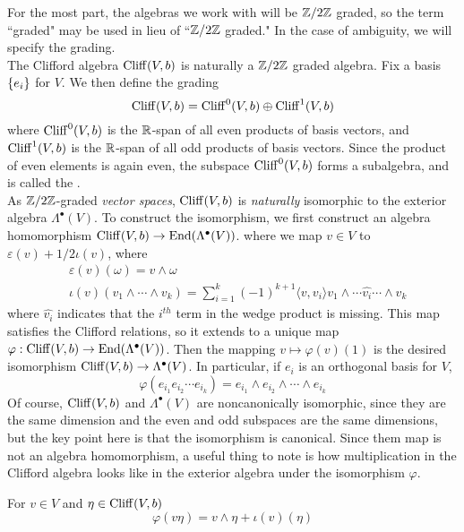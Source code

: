 %
For the most part, the algebras we work with will be $\mathbb{Z}/2\mathbb{Z}$ graded, so
the term ``graded" may be used in lieu of ``$\mathbb{Z}/2\mathbb{Z}$ graded." In the case of
ambiguity, we will specify the grading. \\
The Clifford algebra $\operatorname{Cliff}(V,b)$ is naturally a $\mathbb{Z}/2\mathbb{Z}$ graded algebra. Fix
a basis $\left\lbrace e_i \right\rbrace$ for $V$. We then define the grading
\[
\operatorname{Cliff}(V,b) = \operatorname{Cliff}^0(V,b) \oplus \operatorname{Cliff}^1(V,b)
\]
where $\operatorname{Cliff}^0(V,b)$ is the $\mathbb{R}$-span of all even products of basis vectors,
and $\operatorname{Cliff}^1(V,b)$ is the $\mathbb{R}$-span of all odd products of basis vectors.
Since the product of even elements is again even, the subspace
$\operatorname{Cliff}^0(V,b)$ forms a subalgebra, and is called the . \\

As $\mathbb{Z}/2\mathbb{Z}$-graded \emph{vector spaces}, $\operatorname{Cliff}(V,b)$ is \emph{naturally}
isomorphic to the exterior algebra $\Lambda^\bullet(V)$. To construct the isomorphism,
we first construct an algebra homomorphism $\operatorname{Cliff}(V,b) \to \operatorname{End}(\Lambda^\bullet(V))$.
where we map $v \in V$
to $\varepsilon(v) + 1/2 \iota(v)$, where
\begin{align*}
&\varepsilon(v)(\omega) = v \wedge \omega \\
&\iota(v)(v_1 \wedge\cdots\wedge v_k)
= \sum_{i = 1}^k (-1)^{k+1}
\langle v,v_i\rangle v_1 \wedge \cdots \widehat{v_i} \cdots \wedge v_k
\end{align*}
where $\widehat{v_i}$ indicates that the $i^{th}$ term in the wedge product is missing.
This map satisfies the Clifford relations, so it extends to a unique map
$\varphi : \operatorname{Cliff}(V,b) \to \operatorname{End}(\Lambda^\bullet(V))$. Then the mapping
$v \mapsto \varphi(v)(1)$ is the desired isomorphism
$\operatorname{Cliff}(V,b) \to \Lambda^\bullet(V)$. In particular, if $e_i$ is an orthogonal basis
for $V$,
\[
\varphi(e_{i_1}e_{i_2}\cdots e_{i_k}) = e_{i_1}\wedge e_{i_2}\wedge\cdots\wedge e_{i_k}
\]
Of course, $\operatorname{Cliff}(V,b)$ and
$\Lambda^\bullet(V)$ are noncanonically isomorphic, since they are the same dimension
and the even and odd subspaces are the same dimensions, but the key point here is that
the isomorphism is canonical. Since them map is not an algebra homomorphism, a useful
thing to note is how multiplication in the Clifford algebra looks like in the exterior
algebra under the isomorphism $\varphi$.
%
\begin{prop}
For $v \in V$ and $\eta \in \operatorname{Cliff}(V,b)$
\[
\varphi(v\eta) = v \wedge \eta + \iota(v)(\eta)
\]
\end{prop}
%
